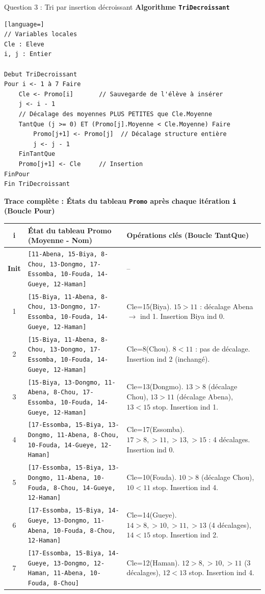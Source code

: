 \documentclass[11pt]{article}
\begin{document}
\begin{exoresolu}{Question 3 : Tri par insertion décroissant}
\textbf{Algorithme \texttt{TriDecroissant}}
\begin{lstlisting}[language=]
// Variables locales
Cle : Eleve
i, j : Entier

Debut TriDecroissant
Pour i <- 1 à 7 Faire
    Cle <- Promo[i]       // Sauvegarde de l'élève à insérer
    j <- i - 1
    // Décalage des moyennes PLUS PETITES que Cle.Moyenne
    TantQue (j >= 0) ET (Promo[j].Moyenne < Cle.Moyenne) Faire
        Promo[j+1] <- Promo[j]  // Décalage structure entière
        j <- j - 1
    FinTantQue
    Promo[j+1] <- Cle     // Insertion
FinPour
Fin TriDecroissant
\end{lstlisting}

\textbf{Trace complète : États du tableau \texttt{Promo} après chaque itération \texttt{i} (Boucle Pour)}
\begin{center}
\small
\begin{tabularx}{\linewidth}{|c|X|l|}
\hline
\textbf{i} & \textbf{État du tableau Promo (Moyenne - Nom)} & \textbf{Opérations clés (Boucle TantQue)} \\
\hline
\textbf{Init} & \texttt{[11-Abena, 15-Biya, 8-Chou, 13-Dongmo, 17-Essomba, 10-Fouda, 14-Gueye, 12-Haman]} & -- \\
\hline
1 & \texttt{[15-Biya, 11-Abena, 8-Chou, 13-Dongmo, 17-Essomba, 10-Fouda, 14-Gueye, 12-Haman]} & Cle=15(Biya). $15>11$ : décalage Abena $\to$ ind 1. Insertion Biya ind 0. \\
\hline
2 & \texttt{[15-Biya, 11-Abena, 8-Chou, 13-Dongmo, 17-Essomba, 10-Fouda, 14-Gueye, 12-Haman]} & Cle=8(Chou). $8<11$ : pas de décalage. Insertion ind 2 (inchangé). \\
\hline
3 & \texttt{[15-Biya, 13-Dongmo, 11-Abena, 8-Chou, 17-Essomba, 10-Fouda, 14-Gueye, 12-Haman]} & Cle=13(Dongmo). $13>8$ (décalage Chou), $13>11$ (décalage Abena), $13<15$ stop. Insertion ind 1. \\
\hline
4 & \texttt{[17-Essomba, 15-Biya, 13-Dongmo, 11-Abena, 8-Chou, 10-Fouda, 14-Gueye, 12-Haman]} & Cle=17(Essomba). $17>8, >11, >13, >15$ : 4 décalages. Insertion ind 0. \\
\hline
5 & \texttt{[17-Essomba, 15-Biya, 13-Dongmo, 11-Abena, 10-Fouda, 8-Chou, 14-Gueye, 12-Haman]} & Cle=10(Fouda). $10>8$ (décalage Chou), $10<11$ stop. Insertion ind 4. \\
\hline
6 & \texttt{[17-Essomba, 15-Biya, 14-Gueye, 13-Dongmo, 11-Abena, 10-Fouda, 8-Chou, 12-Haman]} & Cle=14(Gueye). $14>8, >10, >11, >13$ (4 décalages), $14<15$ stop. Insertion ind 2. \\
\hline
7 & \texttt{[17-Essomba, 15-Biya, 14-Gueye, 13-Dongmo, 12-Haman, 11-Abena, 10-Fouda, 8-Chou]} & Cle=12(Haman). $12>8, >10, >11$ (3 décalages), $12<13$ stop. Insertion ind 4. \\
\hline
\end{tabularx}
\end{center}


\end{exoresolu}
\end{document}

